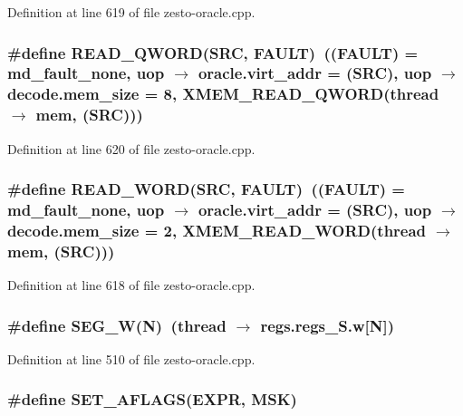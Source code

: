 Definition at line 619 of file zesto-oracle.cpp.
\subsubsection[{READ\_\-QWORD}]{\setlength{\rightskip}{0pt plus 5cm}\#define READ\_\-QWORD(SRC, \/  FAULT)~((FAULT) = md\_\-fault\_\-none, uop $\rightarrow$ oracle.virt\_\-addr = (SRC), uop $\rightarrow$ decode.mem\_\-size = 8, XMEM\_\-READ\_\-QWORD(thread $\rightarrow$ mem, (SRC)))}\label{zesto-oracle_8cpp_7c5f5d585d91dff10f5b6ca754b421f6}




Definition at line 620 of file zesto-oracle.cpp.
\subsubsection[{READ\_\-WORD}]{\setlength{\rightskip}{0pt plus 5cm}\#define READ\_\-WORD(SRC, \/  FAULT)~((FAULT) = md\_\-fault\_\-none, uop $\rightarrow$ oracle.virt\_\-addr = (SRC), uop $\rightarrow$ decode.mem\_\-size = 2, XMEM\_\-READ\_\-WORD(thread $\rightarrow$ mem, (SRC)))}\label{zesto-oracle_8cpp_6a5dc8a34de59be3e818f3e4e548f6c8}




Definition at line 618 of file zesto-oracle.cpp.
\subsubsection[{SEG\_\-W}]{\setlength{\rightskip}{0pt plus 5cm}\#define SEG\_\-W(N)~(thread $\rightarrow$ regs.regs\_\-S.w[N])}\label{zesto-oracle_8cpp_a3788cd9050f7482f9bd8ac25e0ecf5b}




Definition at line 510 of file zesto-oracle.cpp.
\subsubsection[{SET\_\-AFLAGS}]{\setlength{\rightskip}{0pt plus 5cm}\#define SET\_\-AFLAGS(EXPR, \/  MSK)}\label{zesto-oracle_8cpp_c5654cb73f3268e0390e1bd8382c6ad8}


